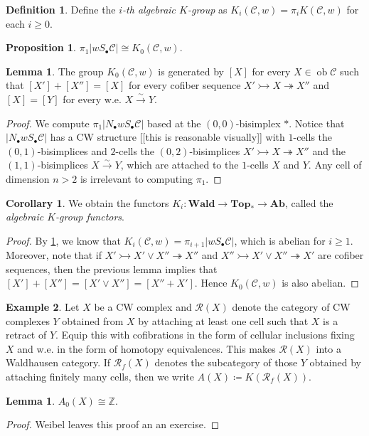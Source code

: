 \documentclass[10pt,letterpaper,cm]{nupset}
\theoremstyle{definition}
\newtheorem{definition}{Definition}
\newtheorem{exmp}[definition]{Example}
\theoremstyle{theorem}
\newtheorem{lemma}[theorem]{Lemma}
\newtheorem{prop}[theorem]{Proposition}
\newtheorem{corollary}[theorem]{Corollary}
\theoremstyle{remark}
\newcommand{\Z}{\mathbb Z}
\newcommand{\1}{\mathbf{1}}
\renewcommand{\c}{\mathscr{C}}
\newcommand{\0}{\vec 0}
\DeclareMathOperator{\ob}{ob}
\begin{document}
\begin{definition}
Define the \textit{$i$-th algebraic $K$-group} as $K_i(\c, w) = \pi_iK(\c, w)$ for each $i\geq 0$. 
\end{definition}

\begin{prop}\label{P4}
$\pi_1|w S_{\bullet} \c| \cong K_0(\c, w)$.
\end{prop}

\begin{lemma}
The group $K_0(\c, w)$ is generated by $[X]$ for every $X \in \ob \c$ such that $[X'] + [X''] = [X]$ for every cofiber sequence $X' \rightarrowtail X \twoheadrightarrow X''$ and $[X] = [Y]$ for every w.e. $X \overset{\sim}{\longrightarrow} Y$.
\end{lemma}
\begin{proof}
We compute $\pi_1|N_{\bullet}w S_{\bullet} \c|$ based at the $(0,0)$-bisimplex $\ast$. Notice that $|N_{\bullet}w S_{\bullet} \c|$ has a CW structure {[[this is reasonable visually]]} with $1$-cells the $(0,1)$-bisimplices and $2$-cells the $(0,2)$-bisimplices $X' \rightarrowtail X \twoheadrightarrow X''$ and the $(1,1)$-bisimplices $X \overset{\sim}{\longrightarrow} Y$, which are attached to the $1$-cells $X$ and $Y$. Any cell of dimension $n>2$ is irrelevant to computing $\pi_1$.
\end{proof}

\begin{corollary}
We obtain the functors $K_i : \mathbf{Wald} \to \mathbf{Top_{\ast}} \to \mathbf{Ab}$, called the \textit{algebraic $K$-group functors}.
\end{corollary}
\begin{proof}
By \cref{P4}, we know that $K_i(\c, w) = \pi_{i+1}|w S_{\bullet} \c|$, which is abelian for $i\geq 1$. Moreover, note that if $X' \rightarrowtail X' \vee X'' \twoheadrightarrow X''$ and $X'' \rightarrowtail X' \vee X'' \twoheadrightarrow X'$ are cofiber sequences, then the previous lemma implies that $[X'] + [X''] = [X' \vee X''] = [X'' + X']$. Hence $K_0(\c, w)$ is also abelian.
\end{proof}

\begin{exmp}
Let $X$ be a CW complex and $\mathcal{R}(X)$ denote the category of CW complexes $Y$  obtained from $X$ by attaching at least one cell such that $X$ is a retract of $Y$. Equip this with cofibrations in the form of cellular inclusions fixing $X$ and w.e. in the form of homotopy equivalences. This makes $\mathcal{R}(X)$ into a Waldhausen category. If $\mathcal{R}_f(X)$ denotes the subcategory of those $Y$ obtained by attaching finitely many cells, then we write $A(X)\coloneqq K(\mathcal{R}_f(X))$.
\begin{lemma}
$A_0(X)\cong \Z$.
\end{lemma}
\begin{proof}
Weibel leaves this proof an an exercise.
\end{proof}
\end{exmp}
\end{document}
